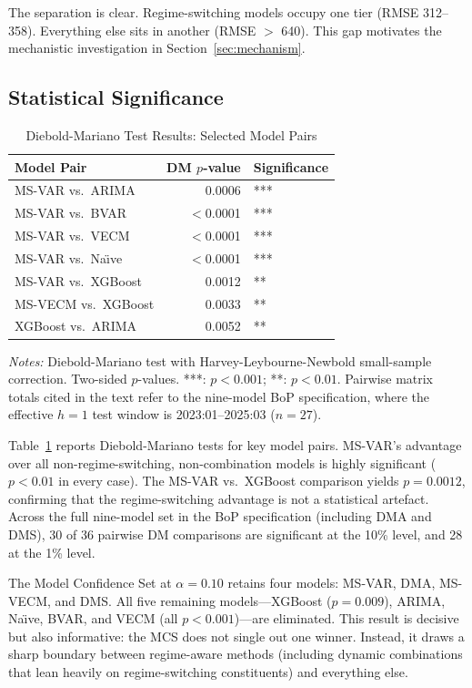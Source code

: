 \documentclass[12pt,a4paper]{article}
\begin{document}
The separation is clear. Regime-switching models occupy one tier (RMSE 312--358). Everything else sits in another (RMSE $>$ 640). This gap motivates the mechanistic investigation in Section~\ref{sec:mechanism}.

\subsection{Statistical Significance}
\label{sec:stat_tests}

\begin{table}[htbp]
\centering
\caption{Diebold-Mariano Test Results: Selected Model Pairs}
\label{tab:dm_tests}
\begin{tabular}{lrl}
\toprule
Model Pair & DM $p$-value & Significance \\
\midrule
MS-VAR vs.\ ARIMA & 0.0006 & *** \\
MS-VAR vs.\ BVAR & $<$0.0001 & *** \\
MS-VAR vs.\ VECM & $<$0.0001 & *** \\
MS-VAR vs.\ Na\"{\i}ve & $<$0.0001 & *** \\
MS-VAR vs.\ XGBoost & 0.0012 & ** \\
MS-VECM vs.\ XGBoost & 0.0033 & ** \\
XGBoost vs.\ ARIMA & 0.0052 & ** \\
\bottomrule
\end{tabular}
\begin{tablenotes}
\small
\item \textit{Notes:} Diebold-Mariano test with Harvey-Leybourne-Newbold small-sample correction. Two-sided $p$-values. ***: $p < 0.001$; **: $p < 0.01$. Pairwise matrix totals cited in the text refer to the nine-model BoP specification, where the effective $h=1$ test window is 2023:01--2025:03 ($n=27$).
\end{tablenotes}
\end{table}

Table~\ref{tab:dm_tests} reports Diebold-Mariano tests for key model pairs. MS-VAR's advantage over all non-regime-switching, non-combination models is highly significant ($p < 0.01$ in every case). The MS-VAR vs.\ XGBoost comparison yields $p = 0.0012$, confirming that the regime-switching advantage is not a statistical artefact. Across the full nine-model set in the BoP specification (including DMA and DMS), 30 of 36 pairwise DM comparisons are significant at the 10\% level, and 28 at the 1\% level.

The Model Confidence Set at $\alpha = 0.10$ retains four models: MS-VAR, DMA, MS-VECM, and DMS. All five remaining models---XGBoost ($p = 0.009$), ARIMA, Na\"{\i}ve, BVAR, and VECM (all $p < 0.001$)---are eliminated. This result is decisive but also informative: the MCS does not single out one winner. Instead, it draws a sharp boundary between regime-aware methods (including dynamic combinations that lean heavily on regime-switching constituents) and everything else.
\end{document}
